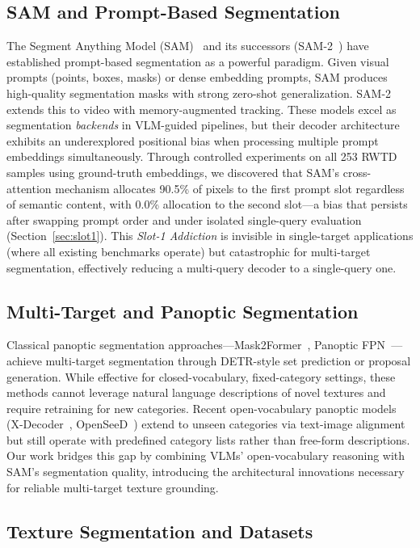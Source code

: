 \documentclass{article}
\begin{document}
\subsection{SAM and Prompt-Based Segmentation}

The Segment Anything Model (SAM)~\cite{sam} and its successors (SAM-2~\cite{sam2}) have established prompt-based segmentation as a powerful paradigm. Given visual prompts (points, boxes, masks) or dense embedding prompts, SAM produces high-quality segmentation masks with strong zero-shot generalization. SAM-2 extends this to video with memory-augmented tracking. These models excel as segmentation \emph{backends} in VLM-guided pipelines, but their decoder architecture exhibits an underexplored positional bias when processing multiple prompt embeddings simultaneously. Through controlled experiments on all 253 RWTD samples using ground-truth embeddings, we discovered that SAM's cross-attention mechanism allocates 90.5\% of pixels to the first prompt slot regardless of semantic content, with 0.0\% allocation to the second slot---a bias that persists after swapping prompt order and under isolated single-query evaluation (Section~\ref{sec:slot1}). This \emph{Slot-1 Addiction} is invisible in single-target applications (where all existing benchmarks operate) but catastrophic for multi-target segmentation, effectively reducing a multi-query decoder to a single-query one.

\subsection{Multi-Target and Panoptic Segmentation}

Classical panoptic segmentation approaches---Mask2Former~\cite{mask2former}, Panoptic FPN~\cite{panopticfpn}---achieve multi-target segmentation through DETR-style set prediction or proposal generation. While effective for closed-vocabulary, fixed-category settings, these methods cannot leverage natural language descriptions of novel textures and require retraining for new categories. Recent open-vocabulary panoptic models (X-Decoder~\cite{xdecoder}, OpenSeeD~\cite{openseed}) extend to unseen categories via text-image alignment but still operate with predefined category lists rather than free-form descriptions. Our work bridges this gap by combining VLMs' open-vocabulary reasoning with SAM's segmentation quality, introducing the architectural innovations necessary for reliable multi-target texture grounding.

\subsection{Texture Segmentation and Datasets}
\end{document}
